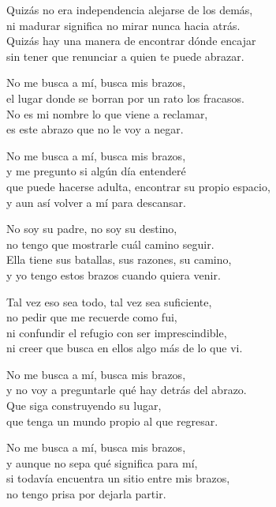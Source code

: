 \begin{lyrics}
Quizás no era independencia alejarse de los demás,\\
ni madurar significa no mirar nunca hacia atrás.\\
Quizás hay una manera de encontrar dónde encajar\\
sin tener que renunciar a quien te puede abrazar.

No me busca a mí, busca mis brazos,\\
el lugar donde se borran por un rato los fracasos.\\
No es mi nombre lo que viene a reclamar,\\
es este abrazo que no le voy a negar.

No me busca a mí, busca mis brazos,\\
y me pregunto si algún día entenderé\\
que puede hacerse adulta, encontrar su propio espacio,\\
y aun así volver a mí para descansar.

No soy su padre, no soy su destino,\\
no tengo que mostrarle cuál camino seguir.\\
Ella tiene sus batallas, sus razones, su camino,\\
y yo tengo estos brazos cuando quiera venir.

Tal vez eso sea todo, tal vez sea suficiente,\\
no pedir que me recuerde como fui,\\
ni confundir el refugio con ser imprescindible,\\
ni creer que busca en ellos algo más de lo que vi.

No me busca a mí, busca mis brazos,\\
y no voy a preguntarle qué hay detrás del abrazo.\\
Que siga construyendo su lugar,\\
que tenga un mundo propio al que regresar.

No me busca a mí, busca mis brazos,\\
y aunque no sepa qué significa para mí,\\
si todavía encuentra un sitio entre mis brazos,\\
no tengo prisa por dejarla partir.
\end{lyrics}

